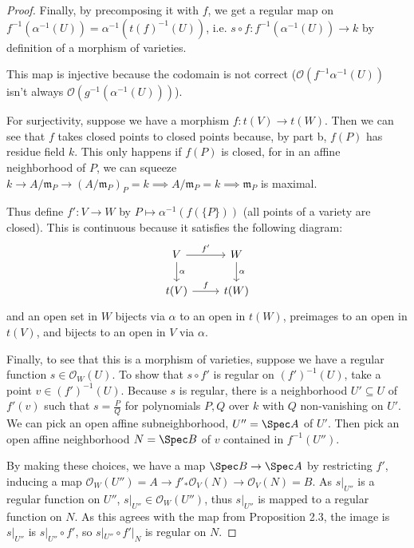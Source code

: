 \begin{proof}
	Finally, by precomposing it with $f$, we get a regular map on $f^{-1}(\alpha ^{-1}(U)) = \alpha ^{-1}(t(f)^{-1}(U)) $, i.e. $s\circ f: f^{-1}(\alpha ^{-1}(U)) \to k$ by definition of a morphism of varieties.

	This map is injective because the codomain is not correct ($\mathcal{O}(f^{-1}\alpha ^{-1}(U)) $ isn't always $\mathcal{O}(g^{-1}(\alpha ^{-1}(U))) $).

	For surjectivity, suppose we have a morphism $f: t(V) \to t(W) $.
	Then we can see that $f $ takes closed points to closed points because, by part b, $f(P) $ has residue field $k $.
	This only happens if $f(P) $ is closed, for in an affine neighborhood of $P $, we can squeeze $k\to A / \mathfrak{m}_P \to (A / \mathfrak{m}_P)_P = k \implies A / \mathfrak{m}_P = k \implies \mathfrak{m}_P$ is maximal.

	Thus define $f': V\to W $ by $P\mapsto \alpha ^{-1}(f(\{P\} ))  $ (all points of a variety are closed).
	This is continuous because it satisfies the following diagram:
	\[
	\begin{tikzcd}
	V & W\\
	t(V) & t(W)
	\arrow["f'",from=1-1,to=1-2]
	\arrow["\alpha",from=1-1,to=2-1]
	\arrow["f",from=2-1,to=2-2]
	\arrow["\alpha",from=1-2,to=2-2]
	\end{tikzcd}
	\]
	and an open set in $W $ bijects via $\alpha $ to an open in $t(W) $, preimages to an open in $t(V) $, and bijects to an open in $V $ via $\alpha $.

	Finally, to see that this is a morphism of varieties, suppose we have a regular function $s \in \mathcal{O}_W(U) $.
	To show that $s\circ f' $ is regular on $(f')^{-1}(U) $, take a point $v \in (f')^{-1}(U) $.
	Because $s  $ is regular, there is a neighborhood $U' \subseteq U$ of $f'(v) $ such that $s = \frac{P}{Q} $ for polynomials $P,Q $ over $k $ with $Q $ non-vanishing on $U' $.
	We can pick an open affine subneighborhood, $U'' = \Spec A $ of $U' $.
	Then pick an open affine neighborhood $N=\Spec B$ of $v $ contained in $f^{-1}(U'') $.

	By making these choices, we have a map $\Spec B \to \Spec A $ by restricting $f' $, inducing a map $\mathcal{O}_W(U'') = A \to f'_\ast\mathcal{O}_V(N) \to \mathcal{O}_V(N) = B$.
	As $s|_{U''} $ is a regular function on $U'' $, $s|_{U''} \in \mathcal{O}_W(U'') $, thus $s|_{U''} $ is mapped to a regular function on $N$.
	As this agrees with the map from Proposition 2.3, the image is $s|_{U''} $ is $s|_{U''} \circ f' $, so $s|_{U''} \circ f'|_{N} $ is regular on $N$.
\end{proof}

